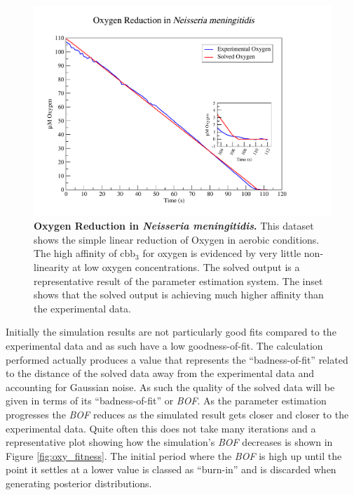 \begin{figure}[p]
 \centering
 \includegraphics[width=14cm, trim=2cm 1cm 4cm 1cm]{./05-oxygenreduction/data/o2sim.pdf}
 \caption[{Oxygen Reduction in \textit{Neisseria meningitidis}.}]{{\bf Oxygen Reduction in \textit{Neisseria meningitidis}.} This dataset shows the simple linear reduction of Oxygen in aerobic conditions. The high affinity of $\mathrm{cbb}_3$ for oxygen is evidenced by very little non-linearity at low oxygen concentrations. The solved output is a representative result of the parameter estimation system. The inset shows that the solved output is achieving much higher affinity than the experimental data.
 \label{fig:o2sim}}
\end{figure}
\afterpage{\clearpage}


Initially the simulation results are not particularly good fits compared to the experimental data and as such have a low goodness-of-fit. The calculation performed actually produces a value that represents the ``badness-of-fit'' related to the distance of the solved data away from the experimental data and accounting for Gaussian noise. As such the quality of the solved data will be given in terms of its ``badness-of-fit'' or \textit{BOF}. As the parameter estimation progresses the \textit{BOF} reduces as the simulated result gets closer and closer to the experimental data. Quite often this does not take many iterations and a representative plot showing how the simulation's \textit{BOF} decreases is shown in Figure \ref{fig:oxy_fitness}. The initial period where the \textit{BOF} is high up until the point it settles at a lower value is classed as ``burn-in'' and is discarded when generating posterior distributions.

